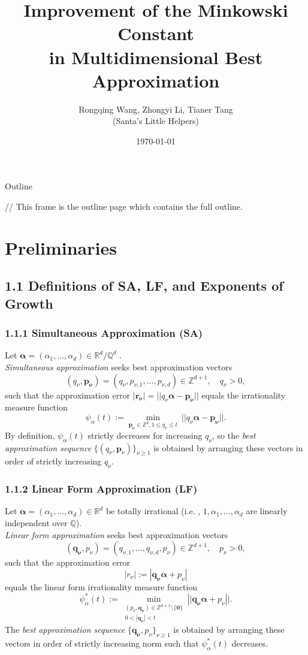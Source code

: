 \documentclass[aspectratio=1610]{beamer}
\title{Improvement of the Minkowski Constant\\ 
       in Multidimensional Best Approximation\\}
\author{Rongqing Wang, Zhongyi Li, Tianer Tang\\
        (Santa's Little Helpers)}
\date\today
\begin{document}
\begin{frame}[plain]
  \titlepage
\end{frame}


\begin{frame}{Outline}
  \tableofcontents

  // This frame is the outline page which contains the full outline.
  \end{frame}



\section{Preliminaries}
\subsection{1.1 Definitions of SA, LF, and Exponents of Growth}

\begin{frame}
  \frametitle{1.1.1 Simultaneous Approximation (SA)}
Let $\boldsymbol{\alpha} = (\alpha_1,\dots,\alpha_d) \in \mathbb{R}^d/ \mathbb{Q}^d$ .\\
\emph{Simultaneous approximation} seeks best approximation vectors
\[
(q_\nu, \mathbf{p_\nu}) = (q_\nu, p_{\nu,1}, \dots, p_{\nu,d}) \in \mathbb{Z}^{d+1}, \quad q_\nu > 0,
\]
such that the approximation error $\mathbf{|r_\nu|} =||q_\nu \boldsymbol{\alpha} - \mathbf{p_\nu}||$ equals the irrationality measure function
\[
\psi_\alpha(t) := \min_{\mathbf{p_\nu} \in \mathbb{Z}^d, 1 \le q_\nu \le t} \ ||q_\nu \boldsymbol{\alpha} - \mathbf{p_\nu}||.
\]
By definition, $\psi_\alpha(t) $ strictly decreases for increasing \(q_\nu\), so the \emph{best approximation sequence} $\{(q_\nu, \mathbf{p}_\nu)\}_{\nu \ge 1}$ is obtained by arranging these vectors in order of strictly increasing $q_\nu$.
\end{frame}

\begin{frame}
  \frametitle{1.1.2 Linear Form Approximation (LF)}
Let $\boldsymbol{\alpha} = (\alpha_1,\dots,\alpha_d) \in \mathbb{R}^d$ be totally irrational (i.e. , $1, \alpha_1, \dots, \alpha_d$ are linearly independent over $\mathbb{Q}$).\\
\emph{Linear form approximation} seeks best approximation vectors
\[
(\mathbf{q_\nu}, p_\nu) = (q_{\nu,1}, \dots, q_{\nu,d}, p_\nu) \in \mathbb{Z}^{d+1}, \quad p_\nu > 0,
\]
such that the approximation error
\[
|r_\nu| := \left| \mathbf{q_\nu \boldsymbol{\alpha}} + p_\nu \right|
\]
equals the linear form irrationality measure function
\[
\psi_\alpha^*(t) := \min_{\substack{(p_\nu, \mathbf{q_\nu}) \in \mathbb{Z}^{d+1} \setminus \{\mathbf{0}\} \\ 0 < |\mathbf{q_\nu}| < t}} \left|| \mathbf{q_\nu \boldsymbol{\alpha}} + p_\nu \right||.
\]
The \emph{best approximation sequence} ${{\mathbf{\{q_\nu}, p_\nu}}\}_{\nu \ge 1}$ is obtained by arranging these vectors in order of strictly increasing norm such that $\psi_\alpha^*(t)$ decreases.

\end{frame}
\end{document}
